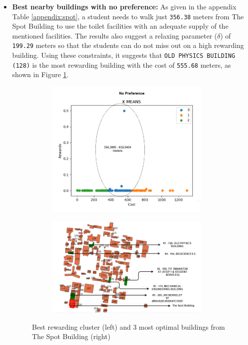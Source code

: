 \begin{itemize}
    \item \textbf{Best nearby buildings with no preference:}
    As given in the appendix Table \ref{appendix:spot}, a student needs to walk just \texttt{356.38} meters from The Spot Building to use the toilet facilities with an adequate supply of the mentioned facilities. The results also suggest a relaxing parameter ($\delta$) of \texttt{199.29} meters so that the students can do not miss out on a high rewarding building. Using these constraints, it suggests that \texttt{OLD PHYSICS BUILDING (128)} is the most rewarding building with the cost of \texttt{555.68} meters, as shown in Figure \ref{fig:s}.
    
    \begin{figure}[H]
\begin{subfigure}{.5\textwidth}
\centering
  \includegraphics[width=8cm]{resources/images/spatial-tr/110plot.png}
\end{subfigure}%
\begin{subfigure}{.5\textwidth}
  \centering
  \includegraphics[width=8cm]{resources/images/spatial-tr/spot1.PNG}
\end{subfigure}
\caption{Best rewarding cluster (left) and 3 most optimal buildings from The Spot Building (right)}
\label{fig:s}
\end{figure}
    

\end{itemize}
